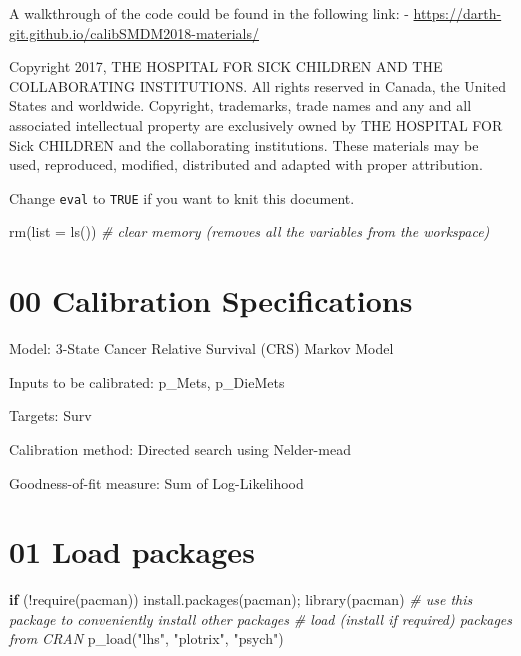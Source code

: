 \documentclass[
]{article}
\newenvironment{Shaded}{\begin{snugshade}}{\end{snugshade}}
\newcommand{\AttributeTok}[1]{\textcolor[rgb]{0.77,0.63,0.00}{#1}}
\newcommand{\CommentTok}[1]{\textcolor[rgb]{0.56,0.35,0.01}{\textit{#1}}}
\newcommand{\ControlFlowTok}[1]{\textcolor[rgb]{0.13,0.29,0.53}{\textbf{#1}}}
\newcommand{\FunctionTok}[1]{\textcolor[rgb]{0.00,0.00,0.00}{#1}}
\newcommand{\NormalTok}[1]{#1}
\newcommand{\SpecialCharTok}[1]{\textcolor[rgb]{0.00,0.00,0.00}{#1}}
\newcommand{\StringTok}[1]{\textcolor[rgb]{0.31,0.60,0.02}{#1}}
\begin{document}
A walkthrough of the code could be found in the following link: -
\url{https://darth-git.github.io/calibSMDM2018-materials/}

Copyright 2017, THE HOSPITAL FOR SICK CHILDREN AND THE COLLABORATING
INSTITUTIONS. All rights reserved in Canada, the United States and
worldwide. Copyright, trademarks, trade names and any and all associated
intellectual property are exclusively owned by THE HOSPITAL FOR Sick
CHILDREN and the collaborating institutions. These materials may be
used, reproduced, modified, distributed and adapted with proper
attribution.

\newpage

Change \texttt{eval} to \texttt{TRUE} if you want to knit this document.

\begin{Shaded}
\begin{Highlighting}[]
\FunctionTok{rm}\NormalTok{(}\AttributeTok{list =} \FunctionTok{ls}\NormalTok{())      }\CommentTok{\# clear memory (removes all the variables from the workspace)}
\end{Highlighting}
\end{Shaded}

\hypertarget{calibration-specifications}{%
\section{00 Calibration
Specifications}\label{calibration-specifications}}

Model: 3-State Cancer Relative Survival (CRS) Markov Model

Inputs to be calibrated: p\_Mets, p\_DieMets

Targets: Surv

Calibration method: Directed search using Nelder-mead

Goodness-of-fit measure: Sum of Log-Likelihood

\hypertarget{load-packages}{%
\section{01 Load packages}\label{load-packages}}

\begin{Shaded}
\begin{Highlighting}[]
\ControlFlowTok{if}\NormalTok{ (}\SpecialCharTok{!}\FunctionTok{require}\NormalTok{(}\StringTok{\textquotesingle{}pacman\textquotesingle{}}\NormalTok{)) }\FunctionTok{install.packages}\NormalTok{(}\StringTok{\textquotesingle{}pacman\textquotesingle{}}\NormalTok{); }\FunctionTok{library}\NormalTok{(pacman) }\CommentTok{\# use this package to conveniently install other packages}
\CommentTok{\# load (install if required) packages from CRAN}
\FunctionTok{p\_load}\NormalTok{(}\StringTok{"lhs"}\NormalTok{, }\StringTok{"plotrix"}\NormalTok{, }\StringTok{"psych"}\NormalTok{)}
\end{Highlighting}
\end{Shaded}
\end{document}
